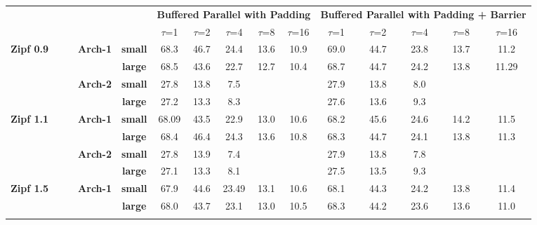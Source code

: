 \documentclass[10pt, conference, compsocconf]{IEEEtran}
\begin{document}
\begin{table}[htbp]
	\centering
	{\def\arraystretch{1.3}
		\begin{tabular}{ccccc||ccccc|ccccc}  
			&&&&                 & \multicolumn{5}{c|}{\textbf{Buffered Parallel with Padding}} & \multicolumn{5}{c}{\textbf{Buffered Parallel with Padding + Barrier}} \\
			&&&&                 & $\tau$=1   & $\tau$=2    & $\tau$=4    & $\tau$=8    & $\tau$=16  & $\tau$=1   & $\tau$=2   & $\tau$=4   & $\tau$=8   & $\tau$=16 \\ \hline
			
			
			\multicolumn{1}{l}{\multirow{4}{*}{\textbf{Zipf 0.9}}}
			&&&\multirow{2}{*}{\textbf{Arch-1}} & \textbf{small}  & 68.3    & 46.7   & 24.4   & 13.6   & 10.9   & 69.0    & 44.7    & 23.8   & 13.7   & 11.2   \\
			&&&& \textbf{large} & 68.5    & 43.6   & 22.7   &   12.7 & 10.4   &  68.7 &	44.7 &	24.2	& 13.8	& 11.29 \\ \cline{2-15}
			
			&&&\multirow{2}{*}{\textbf{Arch-2}} & \textbf{small}  & 27.8    & 13.8   & 7.5   &        &       &  27.9    &  13.8   & 8.0   &        &       \\
			&&&& \textbf{large} &  27.2      &   13.3     &       8.3 &        &       &     27.6   &     13.6    &     9.3   &        &   \\ \hline  
			\multicolumn{1}{l}{\multirow{4}{*}{\textbf{Zipf 1.1}}}
			&&&\multirow{2}{*}{\textbf{Arch-1}} & \textbf{small}  & 68.09    & 43.5   & 22.9   & 13.0   & 10.6   & 68.2    & 45.6    & 24.6   & 14.2   & 11.5   \\
			&&&& \textbf{large} & 68.4    & 46.4   & 24.3   &   13.6 & 10.8   &  68.3 &	44.7 &	24.1	& 13.8	& 11.3 \\ \cline{2-15}
			
			&&&\multirow{2}{*}{\textbf{Arch-2}} & \textbf{small}  & 27.8    & 13.9   & 7.4   &        &       &  27.9    &  13.8   & 7.8   &        &       \\
			&&&& \textbf{large} &  27.1      &   13.3     &       8.1 &        &       &     27.5    &     13.5    &     9.3   &        &   \\ \hline  
			
				\multicolumn{1}{l}{\multirow{4}{*}{\textbf{Zipf 1.5}}}
			&&&\multirow{2}{*}{\textbf{Arch-1}} & \textbf{small}  & 67.9    & 44.6   & 23.49   & 13.1   & 10.6   & 68.1    & 44.3    & 24.2   & 13.8   & 11.4   \\
			&&&& \textbf{large} & 68.0    & 43.7   & 23.1   &   13.0 & 10.5   &  68.3 &	44.2 &	23.6	& 13.6	& 11.0 \\ \cline{2-15}
			

\end{tabular}}
\end{table}
\end{document}
